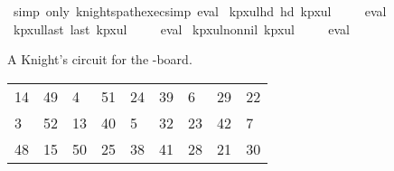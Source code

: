\begin{isabellebody}
\ {\isacharparenleft}{\kern0pt}simp\ only{\isacharcolon}{\kern0pt}\ knights{\isacharunderscore}{\kern0pt}path{\isacharunderscore}{\kern0pt}exec{\isacharunderscore}{\kern0pt}simp{\isacharparenright}{\kern0pt}\ eval%
\endisatagproof
{\isafoldproof}%
%
\isadelimproof
\isanewline
%
\endisadelimproof
\isanewline
{}\isamarkupfalse%
\ kp{\isacharunderscore}{\kern0pt}{}x{}{\isacharunderscore}{\kern0pt}ul{\isacharunderscore}{\kern0pt}hd{\isacharcolon}{\kern0pt}\ {\isachardoublequoteopen}hd\ kp{}x{}ul\ {\isacharequal}{\kern0pt}\ {\isacharparenleft}{\kern0pt}{}{\isacharcomma}{\kern0pt}{}{\isacharparenright}{\kern0pt}{\isachardoublequoteclose}%
\isadelimproof
\ %
\endisadelimproof
%
\isatagproof
{}\isamarkupfalse%
\ eval%
\endisatagproof
{\isafoldproof}%
%
\isadelimproof
%
\endisadelimproof
\isanewline
\isanewline
{}\isamarkupfalse%
\ kp{\isacharunderscore}{\kern0pt}{}x{}{\isacharunderscore}{\kern0pt}ul{\isacharunderscore}{\kern0pt}last{\isacharcolon}{\kern0pt}\ {\isachardoublequoteopen}last\ kp{}x{}ul\ {\isacharequal}{\kern0pt}\ {\isacharparenleft}{\kern0pt}{}{\isacharcomma}{\kern0pt}{}{\isacharparenright}{\kern0pt}{\isachardoublequoteclose}%
\isadelimproof
\ %
\endisadelimproof
%
\isatagproof
{}\isamarkupfalse%
\ eval%
\endisatagproof
{\isafoldproof}%
%
\isadelimproof
%
\endisadelimproof
\isanewline
\isanewline
{}\isamarkupfalse%
\ kp{\isacharunderscore}{\kern0pt}{}x{}{\isacharunderscore}{\kern0pt}ul{\isacharunderscore}{\kern0pt}non{\isacharunderscore}{\kern0pt}nil{\isacharcolon}{\kern0pt}\ {\isachardoublequoteopen}kp{}x{}ul\ {\isasymnoteq}\ {\isacharbrackleft}{\kern0pt}{\isacharbrackright}{\kern0pt}{\isachardoublequoteclose}%
\isadelimproof
\ %
\endisadelimproof
%
\isatagproof
{}\isamarkupfalse%
\ eval%
\endisatagproof
{\isafoldproof}%
%
\isadelimproof
%
\endisadelimproof
%
\begin{isamarkuptext}%
A Knight's circuit for the -board.
  \begin{table}[H]
    \begin{tabular}{lllllllll}
      14 & 49 &  4 & 51 & 24 & 39 &  6 & 29 & 22 \\
       3 & 52 & 13 & 40 &  5 & 32 & 23 & 42 &  7 \\
      48 & 15 & 50 & 25 & 38 & 41 & 28 & 21 & 30 \\

\end{tabular}
\end{table}
\end{isamarkuptext}
\end{isabellebody}
